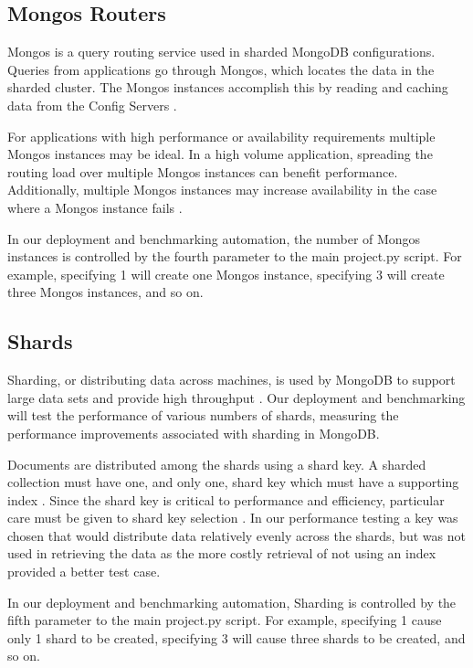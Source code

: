 \documentclass[9pt,twocolumn,twoside]{../../styles/osajnl}
\begin{document}
\subsection{Mongos Routers}

Mongos is a query routing service used in sharded MongoDB configurations.  Queries from applications go through Mongos, which locates the data in the sharded cluster. The Mongos instances accomplish this by reading and caching data from the Config Servers \cite{www-mongoMongos}. 

For applications with high performance or availability requirements multiple Mongos instances may be ideal.  In a high volume application, spreading the routing load over multiple Mongos instances can benefit performance.  Additionally, multiple Mongos instances may increase availability in the case where a Mongos instance fails \cite{www-mongoConfig}.

In our deployment and benchmarking automation, the number of Mongos instances is controlled by the fourth parameter to the main project.py script.  For example, specifying 1 will create one Mongos instance, specifying 3 will create three Mongos instances, and so on. 


\subsection{Shards}

Sharding, or distributing data across machines, is used by MongoDB to support large data sets and provide high throughput \cite{www-sharding}.  Our deployment and benchmarking will test the performance of various numbers of shards, measuring the performance improvements associated with sharding in MongoDB.

Documents are distributed among the shards using a shard key.  A sharded collection must have one, and only one, shard key which must have a supporting index \cite{www-sharding}.  Since the shard key is critical to performance and efficiency, particular care must be given to shard key selection \cite{www-shardkey}. In our performance testing a key was chosen that would distribute data relatively evenly across the shards, but was not used in retrieving the data as the more costly retrieval of not using an index provided a better test case.


In our deployment and benchmarking automation, Sharding is controlled by the fifth parameter to the main project.py script.  For example, specifying 1 cause only 1 shard to be created, specifying 3 will cause three shards to be created, and so on.
\end{document}
